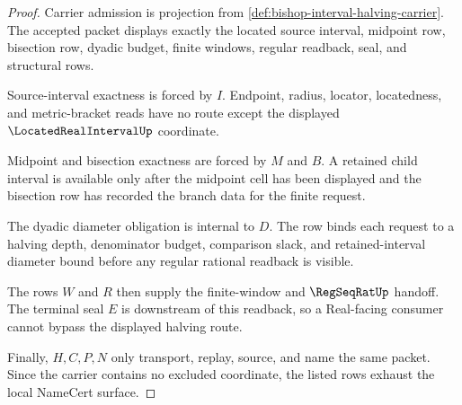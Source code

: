 \begin{proof}
Carrier admission is projection from \autoref{def:bishop-interval-halving-carrier}. The accepted packet displays exactly the located source interval, midpoint row, bisection row, dyadic budget, finite windows, regular readback, seal, and structural rows.

Source-interval exactness is forced by $I$. Endpoint, radius, locator, locatedness, and metric-bracket reads have no route except the displayed $\LocatedRealIntervalUp$ coordinate.

Midpoint and bisection exactness are forced by $M$ and $B$. A retained child interval is available only after the midpoint cell has been displayed and the bisection row has recorded the branch data for the finite request.

The dyadic diameter obligation is internal to $D$. The row binds each request to a halving depth, denominator budget, comparison slack, and retained-interval diameter bound before any regular rational readback is visible.

The rows $W$ and $R$ then supply the finite-window and $\RegSeqRatUp$ handoff. The terminal seal $E$ is downstream of this readback, so a Real-facing consumer cannot bypass the displayed halving route.

Finally, $H,C,P,N$ only transport, replay, source, and name the same packet. Since the carrier contains no excluded coordinate, the listed rows exhaust the local NameCert surface.
\end{proof}

